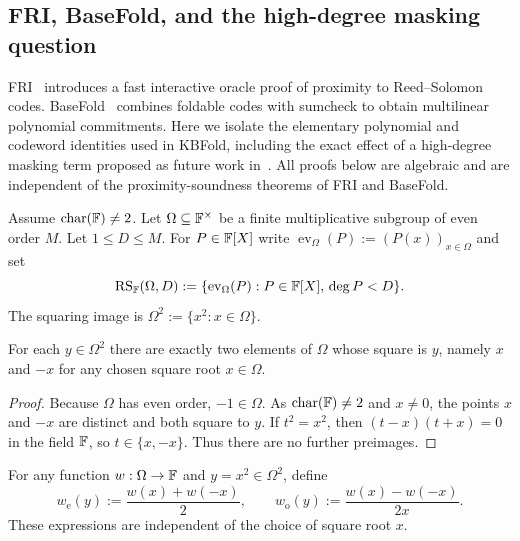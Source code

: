 \subsection{FRI, BaseFold, and the high-degree masking question}\label{sec:history:fri}

FRI~\cite{BBHR2018} introduces a fast interactive oracle proof of proximity to Reed--Solomon codes. BaseFold~\cite{ZCF2023} combines foldable codes with sumcheck to obtain multilinear polynomial commitments. Here we isolate the elementary polynomial and codeword identities used in KBFold, including the exact effect of a high-degree masking term proposed as future work in~\cite{MkhidaKBFold2026}. All proofs below are algebraic and are independent of the proximity-soundness theorems of FRI and BaseFold.

\begin{definition}\label{def:history:rs}
Assume $\operatorname{char}(\mathbb{F})\neq2$. Let $\Omega\subseteq\mathbb{F}^\times$ be a finite multiplicative subgroup of even order $M$. Let $1\leq D\leq M$.
For $P\in\mathbb{F}[X]$ write $\operatorname{ev}_{\Omega}(P):=(P(x))_{x\in\Omega}$ and set
\[
 \operatorname{RS}_{\mathbb{F}}(\Omega,D)
 :=\{\operatorname{ev}_\Omega(P):P\in\mathbb{F}[X],\,\deg P<D\}.
\]
The squaring image is $\Omega^2:=\{x^2:x\in\Omega\}$.
\end{definition}

\begin{lemma}\label{lem:history:fibers}
For each $y\in\Omega^2$ there are exactly two elements of $\Omega$ whose square is $y$, namely $x$ and $-x$ for any chosen square root $x\in\Omega$.
\end{lemma}
\begin{proof}
Because $\Omega$ has even order, $-1\in\Omega$. As $\operatorname{char}(\mathbb{F})\neq2$ and $x\neq0$, the points $x$ and $-x$ are distinct and both square to $y$. If $t^2=x^2$, then $(t-x)(t+x)=0$ in the field $\mathbb{F}$, so $t\in\{x,-x\}$. Thus there are no further preimages.
\end{proof}

\begin{definition}\label{def:history:wordparts}
For any function $w:\Omega\to\mathbb{F}$ and $y=x^2\in\Omega^2$, define
\[
 w_{\mathrm e}(y):=\frac{w(x)+w(-x)}{2},
 \qquad
 w_{\mathrm o}(y):=\frac{w(x)-w(-x)}{2x}.
\]
These expressions are independent of the choice of square root $x$.
\end{definition}

